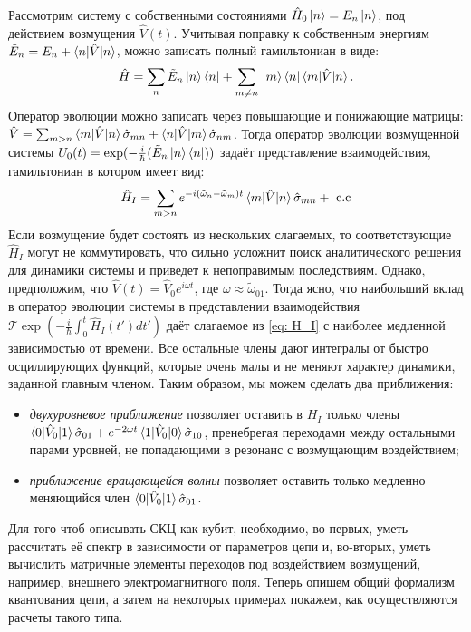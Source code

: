 Рассмотрим систему с собственными состояниями $\hat{H}_0\ket{n} = E_n\ket{n}$, под действием возмущения $\hat{V}(t)$. Учитывая поправку к собственным энергиям ${\tilde{E}_n}=E_n+\braket{n|\hat{V}|n}$, можно записать полный гамильтониан в виде:
\begin{equation}
\hat{H} = \sum_n\tilde{E}_n\ket{n}\bra{n} + \sum_{m \ne n}\textbf{}\ket{m}\bra{n}\braket{m|\hat{V}|n}. 
\end{equation} 
Оператор эволюции можно записать через повышающие и понижающие матрицы: $\hat{V} =   \sum_{m>n}\braket{m|\hat{V}|n}\hat{\sigma}_{mn}+\braket{n|\hat{V}|m}\hat{\sigma}_{nm}$. Тогда оператор эволюции возмущенной системы $U_0(t) = \exp(-\frac{i}{\hbar}(\tilde{E}_n\ket{n}\bra{n}))$ задаёт представление взаимодействия, гамильтониан в котором имеет вид:
\begin{equation}\label{eq: H_I}
\hat{H}_I = \sum_{m>n} e^{-{i}(\tilde{\omega}_n-\tilde{\omega}_m)t}\braket{m|\hat{V}|n}\hat{\sigma}_{mn} + \text{ c.c} 
\end{equation}
Если возмущение будет состоять из нескольких слагаемых, то соответствующие $\hat{H}_I$ могут не коммутировать, что сильно усложнит поиск аналитического решения для динамики системы и приведет к непоправимым последствиям. Однако, предположим, что $\hat{V}(t)\!=\!\hat{V}_0e^{i\omega t}$, где $\omega\!\approx\!\tilde{\omega}_{01}$. Тогда ясно, что наибольший вклад в оператор эволюции системы в представлении взаимодействия $\mathcal{T} \exp (-\frac{i}{\hbar}\int_0^t \hat{H}_I(t')dt')$ даёт слагаемое из \eqref{eq: H_I} с наиболее медленной зависимостью от времени. Все остальные члены дают интегралы от быстро осциллирующих функций, которые очень малы и не меняют характер динамики, заданной главным членом. Таким образом, мы можем сделать два приближения:
\begin{itemize}
	\item \textit{двухуровневое приближение} позволяет оставить в $H_I$ только члены $\braket{0|\hat{V}_0|1}\hat{\sigma}_{01} + e^{-2\omega t}\braket{1|\hat{V}_0|0}\hat{\sigma}_{10}$, пренебрегая переходами между остальными парами уровней, не попадающими в резонанс с возмущающим воздействием;
	\item \textit{приближение вращающейся волны} позволяет оставить только медленно меняющийся член $\braket{0|\hat{V}_0|1}\hat{\sigma}_{01}$.
\end{itemize}

Для того чтоб описывать СКЦ как кубит, необходимо, во-первых, уметь рассчитать её спектр в зависимости от параметров цепи и, во-вторых, уметь вычислить матричные элементы переходов под воздействием возмущений, например, внешнего электромагнитного поля. Теперь опишем общий формализм квантования цепи, а затем на некоторых примерах покажем, как осуществляются расчеты такого типа.
